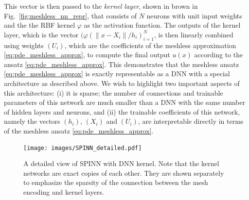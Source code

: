 \documentclass[12pt]{article}
\newcommand{\rr}[1]{#1}
\begin{document}
This vector is then passed to the \emph{kernel layer}, shown in brown in Fig.~\ref{fig:meshless_nn_repr}, that consists of $N$ neurons with unit input weights and the the RBF kernel $\varphi$ as the activation function. The outputs of the kernel layer, which is the vector $(\varphi(\lVert x - X_i\rVert/h_i)_{i=1}^N$, is then linearly combined using weights $(U_i)$, which are the coefficients of the meshless approximation \eqref{eq:pde_meshless_approx}, to compute the final output $u(x)$ according to the ansatz \eqref{eq:pde_meshless_approx}. This demonstrates that the meshless ansatz \eqref{eq:pde_meshless_approx} is exactly representable as a DNN with a special architecture as described above. We wish to highlight two important aspects of this architecture: (i) it is sparse; the number of connections and trainable parameters of this network are much smaller than a DNN with the same number of hidden layers and neurons, and (ii) the trainable coefficients of this network, namely the vectors $(h_i)$, $(X_i)$ and $(U_i)$, are interpretable directly in terms of the meshless ansatz \eqref{eq:pde_meshless_approx}.

\begin{figure}
\centering
\texttt{[image: images/SPINN\_detailed.pdf]}
\caption{A detailed view of SPINN with DNN kernel. \rr{Note that the kernel networks are exact copies of each other. They are shown separately to emphasize the sparsity of the connection between the mesh encoding and kernel layers.}}
\label{fig:meshless_nn_detailed}
\end{figure}
\end{document}
